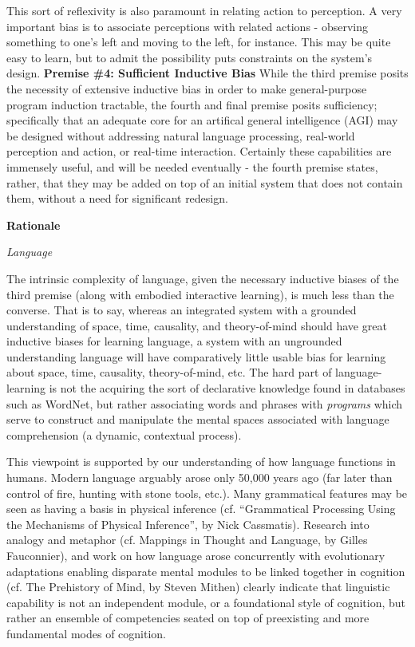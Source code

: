 \documentclass[twoside,11pt]{article}
\begin{document}
This sort of reflexivity is also paramount in relating action to perception. A
very important bias is to associate perceptions with related actions -
observing something to one's left and moving to the left, for instance. This
may be quite easy to learn, but to admit the possibility puts constraints on
the system's design. \textbf{Premise \#4: Sufficient Inductive Bias} While the
third premise posits the necessity of extensive inductive bias in order to make
general-purpose program induction tractable, the fourth and final premise
posits sufficiency; specifically that an adequate core for an artifical general
intelligence (AGI) may be designed without addressing natural language
processing, real-world perception and action, or real-time
interaction. Certainly these capabilities are immensely useful, and will be
needed eventually - the fourth premise states, rather, that they may be added
on top of an initial system that does not contain them, without a need for
significant redesign.

\textbf{Rationale} 

\emph{Language}

The intrinsic complexity of language, given the necessary inductive biases of
the third premise (along with embodied interactive learning), is much less than
the converse. That is to say, whereas an integrated system with a grounded
understanding of space, time, causality, and theory-of-mind should have great
inductive biases for learning language, a system with an ungrounded
understanding language will have comparatively little usable bias for learning
about space, time, causality, theory-of-mind, etc. The hard part of
language-learning is not the acquiring the sort of declarative knowledge found
in databases such as WordNet, but rather associating words and phrases with
\emph{programs} which serve to construct and manipulate the mental spaces
associated with language comprehension (a dynamic, contextual process).

This viewpoint is supported by our understanding of how language functions in
humans. Modern language arguably arose only 50,000 years ago (far later than
control of fire, hunting with stone tools, etc.). Many grammatical features may
be seen as having a basis in physical inference (cf. ``Grammatical Processing
Using the Mechanisms of Physical Inference'', by Nick Cassmatis). Research into
analogy and metaphor (cf. Mappings in Thought and Language, by Gilles
Fauconnier), and work on how language arose concurrently with evolutionary
adaptations enabling disparate mental modules to be linked together in
cognition (cf. The Prehistory of Mind, by Steven Mithen) clearly indicate that
linguistic capability is not an independent module, or a foundational style of
cognition, but rather an ensemble of competencies seated on top of preexisting
and more fundamental modes of cognition.
\end{document}
